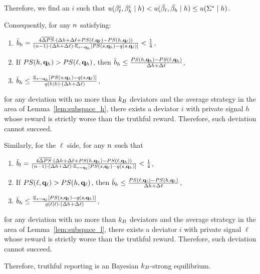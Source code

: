 Therefore, we find an $i$ such that $u(\beta_{\ell}^i, \beta_{h}^i \mid h) < u(\bar{\beta_{\ell}}, \bar{\beta_{h}} \mid h) \le u(\Sigma^* \mid h)$.

Consequently, for any $n$ satisfying:
\begin{enumerate}
    \item $\bar{b}_h = \frac{4\overline{\Delta PS}\cdot (\Delta h + \Delta \ell + PS(\ell, \mathbf{q}_{\ell}) - PS(h, \mathbf{q}_\ell))}{ (n - 1)\cdot (\Delta h +\Delta \ell)\cdot  \mathbb{E}_{s \sim \mathbf{q}_h}[PS(s, \mathbf{q}_h) - q(s, \mathbf{q}_\ell)]} < \frac14$, 
    \item If $PS(h, \mathbf{q}_h) > PS(\ell, \mathbf{q}_h)$, then $\bar{b}_h \le \frac{PS(h, \mathbf{q}_h) - PS(\ell, \mathbf{q}_h)}{\Delta h + \Delta \ell}$, 
    \item $\bar{b}_h \le \frac{\mathbb{E}_{s \sim \mathbf{q}_h}[PS(s, \mathbf{q}_h) - q(s, \mathbf{q}_\ell)]}{q(h\mid h)\cdot (\Delta h + \Delta \ell)}$,
\end{enumerate}
for any deviation with no more than $k_B$ deviators and the average strategy in the area of Lemma~\ref{lem:subspace_h}, there exists a deviator $i$ with private signal $h$ whose reward is strictly worse than the truthful reward. Therefore, such deviation cannot succeed. 

Similarly, for the $\ell$ side, for any $n$ such that
\begin{enumerate}
    \item $\bar{b}_l = \frac{4\overline{\Delta PS}\cdot (\Delta h + \Delta \ell + PS(h, \mathbf{q}_{h}) - PS(\ell, \mathbf{q}_h))}{ (n - 1)\cdot (\Delta h +\Delta \ell)\cdot  \mathbb{E}_{s \sim \mathbf{q}_\ell}[PS(s, \mathbf{q}_\ell) - q(s, \mathbf{q}_h)]} < \frac14$, 
    \item If $PS(\ell, \mathbf{q}_{\ell}) > PS(h, \mathbf{q}_\ell)$, then $\bar{b}_h \le \frac{PS(\ell, \mathbf{q}_{\ell}) - PS(h, \mathbf{q}_\ell)}{\Delta h + \Delta \ell}$, 
    \item $\bar{b}_h \le \frac{\mathbb{E}_{s \sim \mathbf{q}_\ell}[PS(s, \mathbf{q}_\ell) - q(s, \mathbf{q}_h)]}{q(\ell \mid \ell)\cdot (\Delta h + \Delta \ell)}$,
\end{enumerate}
for any deviation with no more than $k_B$ deviators and the average strategy in the area of Lemma~\ref{lem:subspace_l}, there exists a deviator $i$ with private signal $\ell$ whose reward is strictly worse than the truthful reward. Therefore, such deviation cannot succeed. 

Therefore, truthful reporting is an Bayesian $k_B$-strong equilibrium. 


